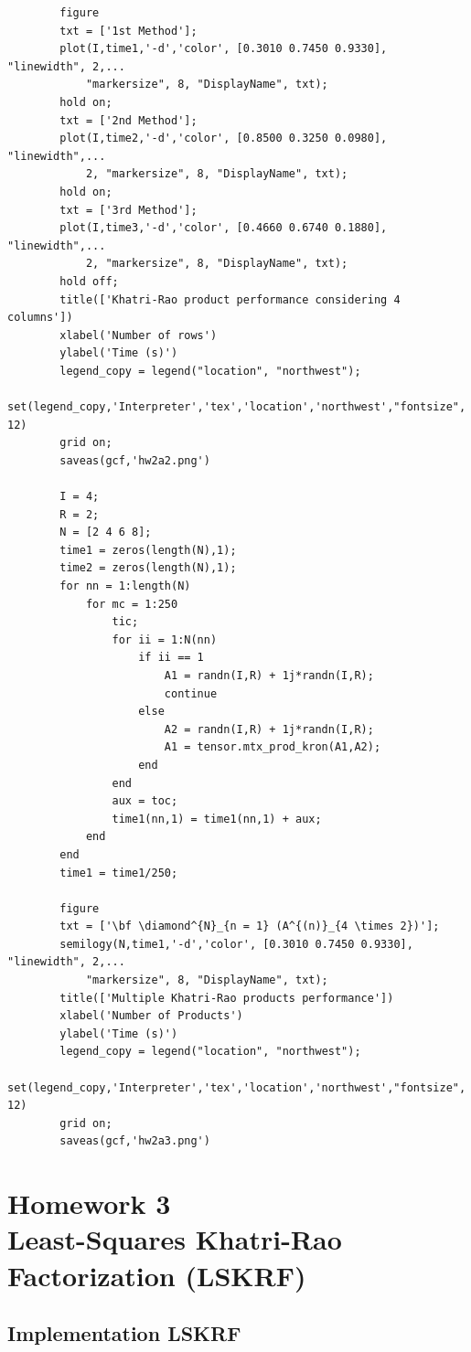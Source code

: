 \documentclass[a4paper,10pt]{article}
\begin{document}
\begin{verbatim}
        figure
        txt = ['1st Method'];
        plot(I,time1,'-d','color', [0.3010 0.7450 0.9330], "linewidth", 2,...
            "markersize", 8, "DisplayName", txt);
        hold on;
        txt = ['2nd Method'];
        plot(I,time2,'-d','color', [0.8500 0.3250 0.0980], "linewidth",...
            2, "markersize", 8, "DisplayName", txt);
        hold on;
        txt = ['3rd Method'];
        plot(I,time3,'-d','color', [0.4660 0.6740 0.1880], "linewidth",...
            2, "markersize", 8, "DisplayName", txt);
        hold off;
        title(['Khatri-Rao product performance considering 4 columns'])
        xlabel('Number of rows')
        ylabel('Time (s)')
        legend_copy = legend("location", "northwest");
        set(legend_copy,'Interpreter','tex','location','northwest',"fontsize", 12)
        grid on;
        saveas(gcf,'hw2a2.png')

        I = 4;
        R = 2;
        N = [2 4 6 8];
        time1 = zeros(length(N),1);
        time2 = zeros(length(N),1);
        for nn = 1:length(N)
            for mc = 1:250 
                tic;
                for ii = 1:N(nn)
                    if ii == 1
                        A1 = randn(I,R) + 1j*randn(I,R); 
                        continue
                    else
                        A2 = randn(I,R) + 1j*randn(I,R);
                        A1 = tensor.mtx_prod_kron(A1,A2);
                    end    
                end
                aux = toc;
                time1(nn,1) = time1(nn,1) + aux;
            end
        end
        time1 = time1/250;

        figure
        txt = ['\bf \diamond^{N}_{n = 1} (A^{(n)}_{4 \times 2})'];
        semilogy(N,time1,'-d','color', [0.3010 0.7450 0.9330], "linewidth", 2,...
            "markersize", 8, "DisplayName", txt);
        title(['Multiple Khatri-Rao products performance'])
        xlabel('Number of Products')
        ylabel('Time (s)')
        legend_copy = legend("location", "northwest");
        set(legend_copy,'Interpreter','tex','location','northwest',"fontsize", 12)
        grid on;
        saveas(gcf,'hw2a3.png')
    \end{verbatim}

\newpage
\section*{Homework 3 \\ Least-Squares Khatri-Rao Factorization (LSKRF)}

    \subsection*{Implementation LSKRF}
\end{document}
